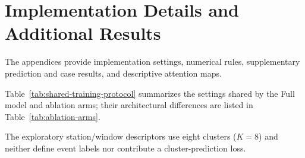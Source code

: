\suppressfloats[t]
\label{ch:appendix}
\setcounter{section}{0}
\renewcommand{\thesection}{\Alph{section}}
\renewcommand{\thesubsection}{\thesection.\arabic{subsection}}
\renewcommand{\theHsection}{appendix.\Alph{section}}
\renewcommand{\theHfigure}{appendix.\thesection.\arabic{figure}}
\renewcommand{\theHtable}{appendix.\thesection.\arabic{table}}
\renewcommand{\theHequation}{appendix.\thesection.\arabic{equation}}
\FloatBarrier
\section{Implementation Details and Additional Results}\label{app:additional}

The appendices provide implementation settings, numerical rules, supplementary prediction and case results, and descriptive attention maps.

Table~\ref{tab:shared-training-protocol} summarizes the settings shared by the Full model and ablation arms; their architectural differences are listed in Table~\ref{tab:ablation-arms}.

The exploratory station/window descriptors use eight clusters ($K=8$) and neither define event labels nor contribute a cluster-prediction loss.

